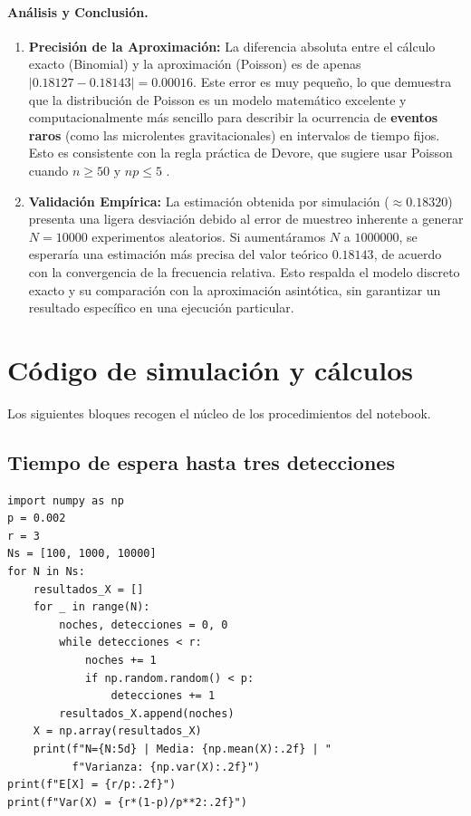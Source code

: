 \documentclass[11pt,a4paper]{article}
\begin{document}
\paragraph{Análisis y Conclusión.}
\begin{enumerate}
    \item \textbf{Precisión de la Aproximación:} La diferencia absoluta entre el cálculo exacto (Binomial) y la aproximación (Poisson) es de apenas $|0.18127-0.18143|=0.00016$. Este error es muy pequeño, lo que demuestra que la distribución de Poisson es un modelo matemático excelente y computacionalmente más sencillo para describir la ocurrencia de \textbf{eventos raros} (como las microlentes gravitacionales) en intervalos de tiempo fijos. Esto es consistente con la regla práctica de Devore, que sugiere usar Poisson cuando $n\geq50$ y $np\leq5$ \citep[p.~122]{devore2008}.
    \item \textbf{Validación Empírica:} La estimación obtenida por simulación ($\approx0.18320$) presenta una ligera desviación debido al error de muestreo inherente a generar $N=10000$ experimentos aleatorios. Si aumentáramos $N$ a $1000000$, se esperaría una estimación más precisa del valor teórico $0.18143$, de acuerdo con la convergencia de la frecuencia relativa. Esto respalda el modelo discreto exacto y su comparación con la aproximación asintótica, sin garantizar un resultado específico en una ejecución particular.
\end{enumerate}




\clearpage
\appendix
\lstset{basicstyle=\ttfamily\scriptsize, aboveskip=0.5em, belowskip=0.5em}
\section{Código de simulación y cálculos}

Los siguientes bloques recogen el núcleo de los procedimientos del notebook.

\subsection{Tiempo de espera hasta tres detecciones}

\begin{lstlisting}
import numpy as np
p = 0.002
r = 3
Ns = [100, 1000, 10000]
for N in Ns:
    resultados_X = []
    for _ in range(N):
        noches, detecciones = 0, 0
        while detecciones < r:
            noches += 1
            if np.random.random() < p:
                detecciones += 1
        resultados_X.append(noches)
    X = np.array(resultados_X)
    print(f"N={N:5d} | Media: {np.mean(X):.2f} | "
          f"Varianza: {np.var(X):.2f}")
print(f"E[X] = {r/p:.2f}")
print(f"Var(X) = {r*(1-p)/p**2:.2f}")
\end{lstlisting}
\end{document}
